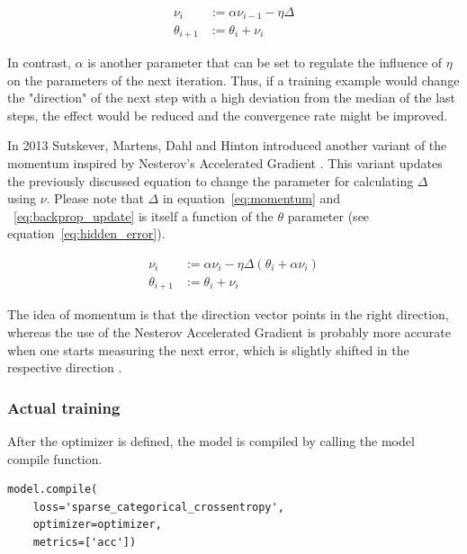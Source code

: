 \begin{equation}
    \begin{split}
        \nu_{i} &:= \alpha \nu_{i-1} - \eta \varDelta \\
        \theta_{i+1} &:= \theta_i + \nu_i
    \end{split}
    \label{eq:momentum}
\end{equation}

In contrast, $\alpha$ is another parameter that can be set to regulate the influence of $\eta$ on the parameters of the next iteration.
Thus, if a training example would change the "direction" of the next step with a high deviation from the median of the last steps, the effect would be reduced and the convergence rate might be improved. 

In 2013 Sutskever, Martens, Dahl and Hinton \cite{Sutskever2013} introduced another variant of the momentum inspired by Nesterov's Accelerated Gradient \cite{Nesterov1983}.
This variant updates the previously discussed equation to change the parameter for calculating $\varDelta$ using $\nu$.
Please note that $\varDelta$ in equation~\eqref{eq:momentum} and ~\eqref{eq:backprop_update} is itself a function of the $\theta$ parameter (see equation~\eqref{eq:hidden_error}).

\begin{equation}
    \begin{split}
    \nu_i & := \alpha \nu_i - \eta \varDelta(\theta_i + \alpha \nu_i) \\
    \theta_{i+1} & := \theta_i + \nu_i
    \end{split}
    \label{eq:nesterov}
\end{equation}

The idea of momentum is that the direction vector points in the right direction, whereas the use of the Nesterov Accelerated Gradient is probably more accurate when one starts measuring the next error, which is slightly shifted in the respective direction \cite[p.353]{Geron2019} \cite[p.291]{Goodfellow2017}.

\subsubsection{Actual training}

After the optimizer is defined, the model is compiled by calling the model compile function.

\begin{lstlisting}
model.compile(
    loss='sparse_categorical_crossentropy', 
    optimizer=optimizer,
    metrics=['acc'])
\end{lstlisting}

